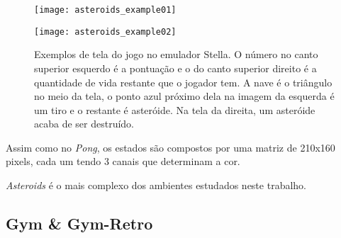 \begin{figure}[h!]
  \begin{minipage}[b]{.5\textwidth}
  \centering
  \texttt{[image: asteroids\_example01]}
  \end{minipage}
  \hfill
  \begin{minipage}[b]{.5\textwidth}
  \texttt{[image: asteroids\_example02]}
  \end{minipage}
  \caption{Exemplos de tela do jogo no emulador Stella. O número no canto superior esquerdo é a pontuação e o do canto superior direito é a quantidade de vida restante que o jogador tem. A nave é o triângulo no meio da tela, o ponto azul próximo dela na imagem da esquerda é um tiro e o restante é asteróide. Na tela da direita, um asteróide acaba de ser destruído.}
\end{figure}

Assim como no \textit{Pong}, os estados são compostos por uma matriz de 210x160 pixels, cada um tendo 3 canais que determinam a cor.

\textit{Asteroids} é o mais complexo dos ambientes estudados neste trabalho.




\subsection{Gym \& Gym-Retro}
\label{sec:gymretro}

